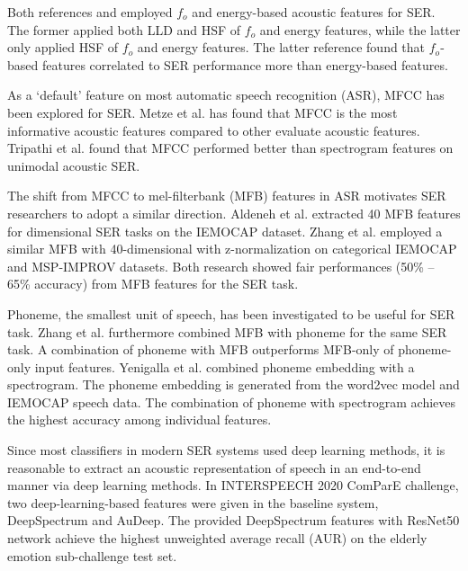 Both references \cite{Lee2002} and \cite{Schuller2004} employed $f_o$ and
energy-based acoustic features for SER. The former applied both LLD and HSF of
$f_o$ and energy features, while the latter only applied HSF of $f_o$ and energy
features. The latter reference found that $f_o$-based features correlated to
SER performance more than energy-based features.

As a `default' feature on most automatic speech recognition (ASR), MFCC has
been explored for SER. Metze et al. \cite{Metze2009} has found that MFCC is the
most informative acoustic features compared to other evaluate acoustic
features. Tripathi et al. \cite{Tripathi2019} found that MFCC performed better
than spectrogram features on unimodal acoustic SER. 

The shift from MFCC to mel-filterbank (MFB) features in ASR motivates SER
researchers to adopt a similar direction. Aldeneh et al. \cite{Aldeneh2017}
extracted 40 MFB features for dimensional SER tasks on the IEMOCAP dataset.
Zhang et al.  \cite{Zhang2019} employed a similar MFB with 40-dimensional with
z-normalization on categorical IEMOCAP and MSP-IMPROV datasets. Both research
showed fair performances (50\% -- 65\% accuracy) from MFB features for the SER
task.

Phoneme, the smallest unit of speech, has been investigated to be useful for
SER task. Zhang et al. \cite{Zhang2019} furthermore combined MFB with phoneme
for the same SER task. A combination of phoneme with MFB outperforms MFB-only
of phoneme-only input features. Yenigalla et al. \cite{Yenigalla2018} combined
phoneme embedding with a spectrogram. The phoneme embedding is generated from
the word2vec model \cite{Mikolov} and IEMOCAP speech data. The combination of
phoneme with spectrogram achieves the highest accuracy among individual
features.

Since most classifiers in modern SER systems used deep learning methods, it is
reasonable to extract an acoustic representation of speech in an end-to-end
manner via deep learning methods. In INTERSPEECH 2020 ComParE challenge, two
deep-learning-based features were given in the baseline system, DeepSpectrum
and AuDeep. The provided DeepSpectrum features with ResNet50 network achieve
the highest unweighted average recall (AUR) on the elderly emotion
sub-challenge test set.

